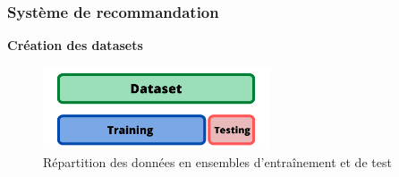\documentclass{beamer}
\begin{document}
\begin{frame}
    \scriptsize
    \frametitle{Système de recommandation}
    \vspace{0.3cm}
    {\large\textbf{Création des datasets}\\}
    \vspace{0.3cm}
    \begin{figure}
        \centering
        \includegraphics[width=0.60\textwidth]{trainset.png}
        \caption{Répartition des données en ensembles d'entraînement et de test}
    \end{figure}


\end{frame}
\end{document}

